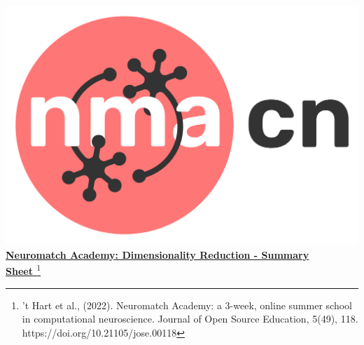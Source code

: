 \documentclass[10pt,a4paper]{article}
\begin{document}

\includegraphics[scale=0.03]{Figures/NMACN.png}\href{https://compneuro.neuromatch.io/tutorials/intro.html}{\textbf{\Huge{Neuromatch Academy: Dimensionality Reduction - Summary\\ Sheet }}\footnote{’t Hart et al., (2022). Neuromatch Academy: a 3-week, online summer school in computational neuroscience. Journal of Open Source Education, 5(49), 118. https://doi.org/10.21105/jose.00118}}
\begin{multicols}{3}

\end{multicols}

\end{document}
